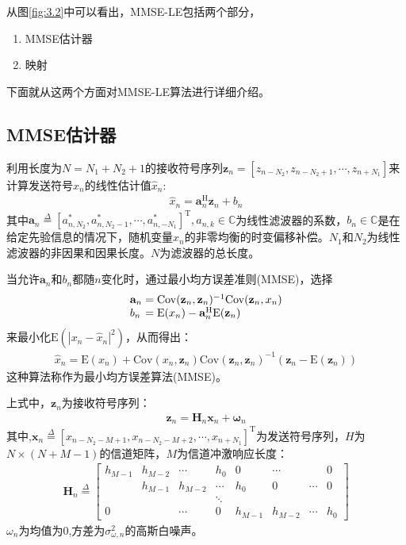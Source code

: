 从图\ref{fig:3.2}中可以看出，MMSE-LE包括两个部分，
\begin{enumerate}
    \item MMSE估计器
    \item 映射
\end{enumerate}
下面就从这两个方面对MMSE-LE算法进行详细介绍。
\subsection{MMSE估计器}
利用长度为$N=N_1+N_2+1$的接收符号序列$\mathbf{z}_n=[z_{n-N_2},z_{n-N_2+1},\cdots,z_{n+N_1}]$来计算发送符号$x_n$的线性估计值$\hat{x}_n$:
\begin{eqnarray}
    \hat{x}_n=\mathbf{a}_n^{\mathrm{H}}\mathbf{z}_n+b_n
    \label{equ:3.1}
\end{eqnarray}
其中$\mathbf{a}_n\overset{\Delta}{=}[a_{n,N_2}^*,a_{n,N_2-1}^*,\cdots,a_{n,-N_1}^*]^{\mathrm{T}},a_{n,k}\in
\mathbb{C}$为线性滤波器的系数，$b_n\in
\mathbb{C}$是在给定先验信息的情况下，随机变量$x_n$的非零均衡的时变偏移补偿。$N_1$和$N_2$为线性滤波器的非因果和因果长度。$N$为滤波器的总长度。

当允许$\mathbf{a}_n$和$b_n$都随$n$变化时，通过最小均方误差准则(MMSE)，选择
\begin{eqnarray}
    \begin{array}{l@{\;=\;}l}
        \mathbf{a}_n&\mathrm{Cov}(\mathbf{z}_n,\mathbf{z}_n)^{-1}\mathrm{Cov}(\mathbf{z}_n,x_n)\\   
        b_n&\mathrm{E}(x_n)-\mathbf{a}_n^{\mathrm{H}}\mathrm{E}(\mathbf{z}_n)
    \end{array}
    \label{equ:3.2}
\end{eqnarray}
来最小化$\mathrm{E}(|x_n-\hat{x}_n|^2)$，从而得出：
\begin{eqnarray}
    \hat{x}_n=\mathrm{E}(x_n)+\mathrm{Cov}(x_n,\mathbf{z}_n)\mathrm{Cov}(\mathbf{z}_n,\mathbf{z}_n)^{-1}(\mathbf{z}_n-\mathrm{E}(\mathbf{z}_n))
    \label{equ:3.3}
\end{eqnarray}
这种算法称作为最小均方误差算法(MMSE)。

上式中，$\mathbf{z}_n$为接收符号序列：
\begin{eqnarray}
    \mathbf{z}_n=\mathbf{H}_n\mathbf{x}_n+\boldsymbol{\omega}_n
    \label{equ:3.4}
\end{eqnarray}
其中,$\mathbf{x}_n\overset{\Delta}{=}[x_{n-N_2-M+1},x_{n-N_2-M+2},\cdots,x_{n+N_1}]^{\mathrm{T}}$为发送符号序列，$H$为$N\times
(N+M-1)$的信道矩阵，$M$为信道冲激响应长度：
\begin{eqnarray}
\mathbf{H}_n\overset{\Delta}{=}\begin{bmatrix}
 h_{M-1}&h_{M-2}  &\cdots  & h_0 & 0 & \cdots &  &0 \\ 
 &h_{M-1}  & h_{M-2} & \cdots & h_0 & 0 & \cdots &0 \\ 
 &  &  &  \ddots&  &  &  & \\ 
 0&  & \cdots & 0 & h_{M-1} &h_{M-2}  &\cdots  & h_0
\end{bmatrix}    
    \label{equ:3.5}
\end{eqnarray}
$\omega_n$为均值为$0$,方差为$\sigma_{\omega,n}^2$的高斯白噪声。

